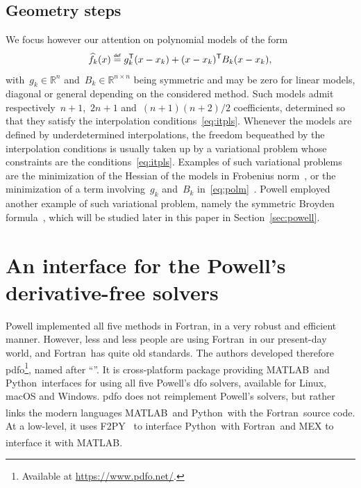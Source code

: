 \documentclass[11pt,draft]{article}
\numberwithin{equation}{section}
\def\defeq{\ensuremath{\mathrel{\stackrel{\text{\tiny\textsf{def}}}{=}}}}
\def\sft{\ensuremath{\mathsf{T}}}
\def\R{\ensuremath{\mathds{R}}}
\newcommand\objmdl[1][k]{\smash{\widehat{f}_{#1}}}
\newcommand\iter[1][k]{x_{#1}}
\newcommand\grad[1][k]{g_{#1}}
\newcommand\hess[1][k]{B_{#1}}
\def\fortran{\mbox{Fortran}}
\def\matlab{\mbox{MATLAB\textsuperscript{\textregistered}}}
\def\python{\mbox{Python}}
\begin{document}
\subsection{Geometry steps}

We focus however our attention on polynomial models of the form
\begin{equation}
    \label{eq:polm}
    \objmdl(x) \defeq \grad^{\sft} (x - \iter) + (x - \iter)^{\sft} \hess (x - \iter),
\end{equation}
with~$\grad \in \R^n$ and~$\hess \in \R^{n \times n}$ being symmetric and may be zero for linear models, diagonal or general depending on the considered method.
Such models admit respectively~$n + 1$,~$2n + 1$ and~$(n + 1)(n + 2) / 2$ coefficients, determined so that they satisfy the interpolation conditions~\eqref{eq:itpls}.
Whenever the models are defined by underdetermined interpolations, the freedom bequeathed by the interpolation conditions is usually taken up by a variational problem whose constraints are the conditions~\eqref{eq:itpls}.
Examples of such variational problems are the minimization of the Hessian of the models in Frobenius norm~\cite{Conn_Scheinberg_Toint_1998, Wild_2008}, or the minimization of a term involving~$\grad$ and~$\hess$ in~\eqref{eq:polm}~\cite{Conn_Toint_1996}.
Powell employed another example of such variational problem, namely the symmetric Broyden formula~\cite{Powell_1970b, Powell_2004a}, which will be studied later in this paper in Section~\ref{sec:powell}.

\section{An interface for the Powell's derivative-free solvers}
\label{sec:pdfo}

Powell implemented all five methods in \fortran, in a very robust and efficient manner.
However, less and less people are using \fortran\ in our present-day world, and \fortran\ has quite old standards.
The authors developed therefore \gls{pdfo}\footnote{Available at \url{https://www.pdfo.net/}.}, named after \enquote{}.
It is cross-platform package providing \matlab\ and \python\ interfaces for using all five Powell's \gls{dfo} solvers, available for Linux, macOS and Windows.
\Gls{pdfo} does not reimplement Powell's solvers, but rather links the modern languages \matlab\ and \python\ with the \fortran\ source code.
At a low-level, it uses F2PY~\cite{Peterson_2009} to interface \python\ with \fortran\, and MEX to interface it with \matlab.
\end{document}

